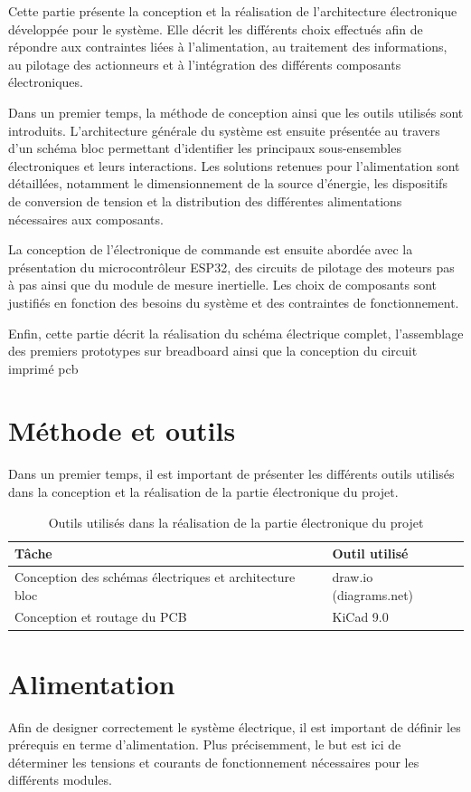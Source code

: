 Cette partie présente la conception et la réalisation de l'architecture électronique développée pour le système. Elle décrit les différents choix effectués afin de répondre aux contraintes liées à l'alimentation, au traitement des informations, au pilotage des actionneurs et à l'intégration des différents composants électroniques.

Dans un premier temps, la méthode de conception ainsi que les outils utilisés sont introduits. L'architecture générale du système est ensuite présentée au travers d'un schéma bloc permettant d'identifier les principaux sous-ensembles électroniques et leurs interactions. Les solutions retenues pour l'alimentation sont détaillées, notamment le dimensionnement de la source d'énergie, les dispositifs de conversion de tension et la distribution des différentes alimentations nécessaires aux composants.

La conception de l'électronique de commande est ensuite abordée avec la présentation du microcontrôleur ESP32, des circuits de pilotage des moteurs pas à pas ainsi que du module de mesure inertielle. Les choix de composants sont justifiés en fonction des besoins du système et des contraintes de fonctionnement.

Enfin, cette partie décrit la réalisation du schéma électrique complet, l'assemblage des premiers prototypes sur breadboard ainsi que la conception du circuit imprimé \gls{pcb}
\section{Méthode et outils}

Dans un premier temps, il est important de présenter les différents outils utilisés dans la conception et la réalisation de la partie électronique du projet.

\begin{table}[H]
\centering
\begin{tabular}{|l|l|}
\hline
\textbf{Tâche} & \textbf{Outil utilisé} \\
\hline
Conception des schémas électriques et architecture bloc & draw.io (diagrams.net) \\
\hline
Conception et routage du PCB & KiCad 9.0 \\
\hline
\end{tabular}
\caption{Outils utilisés dans la réalisation de la partie électronique du projet}
\label{tab:outils_utilises_electronique}
\end{table}

\section{Alimentation}
\label{section:alimentation}
Afin de designer correctement le système électrique, il est important de définir les prérequis en terme d'alimentation. Plus précisemment, le but est ici de déterminer les tensions et courants de fonctionnement nécessaires pour les
différents modules.

